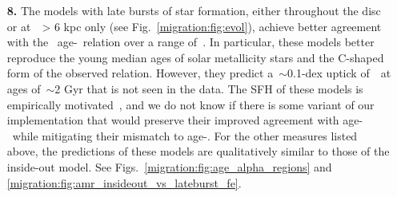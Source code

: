 \begin{enumerate}
	\item[\textbf{8.}] The models with late bursts of star formation, either 
	throughout the disc or at~\rgal~> 6 kpc only (see Fig.~\ref{migration:fig:evol}), 
	achieve better agreement with the~\citet{Feuillet2019} age-\feh~relation 
	over a range of~\rgal. 
	In particular, these models better reproduce the young median ages of solar 
	metallicity stars and the C-shaped form of the observed relation. 
	However, they predict a~$\sim$0.1-dex uptick of~\ofe~at ages of~$\sim$2 Gyr 
	that is not seen in the data. 
	The SFH of these models is empirically motivated~\citep{Mor2019, Isern2019}, 
	and we do not know if there is some variant of our implementation that 
	would preserve their improved agreement with age-\feh~while mitigating 
	their mismatch to age-\ofe. 
	For the other measures listed above, the predictions of these models are 
	qualitatively similar to those of the inside-out model. 
	See Figs.~\ref{migration:fig:age_alpha_regions} and 
	\ref{migration:fig:amr_insideout_vs_lateburst_fe}. 

\end{enumerate} 

